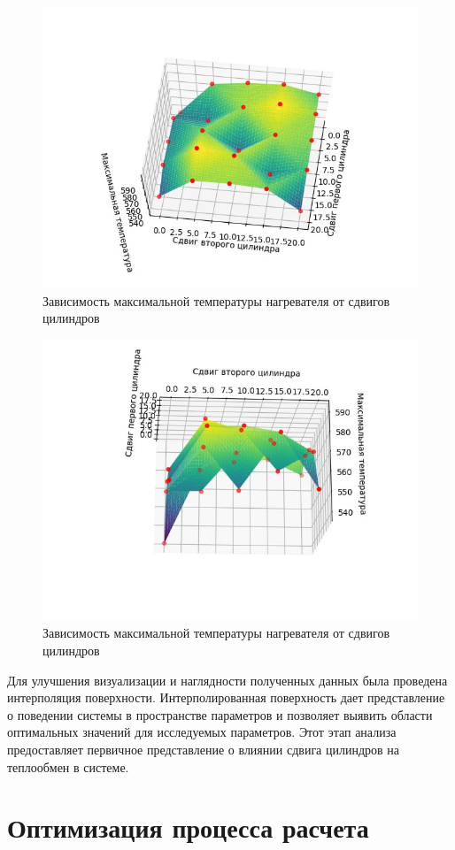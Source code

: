 \documentclass[a4paper,12pt]{extreport}
\numberwithin{equation}{chapter}
\begin{document}
\begin{figure}[h]
	\begin{center}
		\includegraphics[width=0.4\linewidth]{images/16.2.jpg}
		\caption{Зависимость максимальной температуры нагревателя от сдвигов цилиндров} %
	\end{center}
\end{figure}
\newpage
\begin{figure}[h]
	\begin{center}
		\includegraphics[width=0.4\linewidth]{images/16.3.jpg}
		\caption{Зависимость максимальной температуры нагревателя от сдвигов цилиндров} %
	\end{center}
\end{figure}

Для улучшения визуализации и наглядности полученных данных была проведена интерполяция поверхности.
Интерполированная поверхность дает представление о поведении системы в пространстве параметров и позволяет выявить области оптимальных значений для исследуемых параметров.
Этот этап анализа предоставляет первичное представление о влиянии сдвига цилиндров на теплообмен в системе.

\section{Оптимизация процесса расчета}
\end{document}
